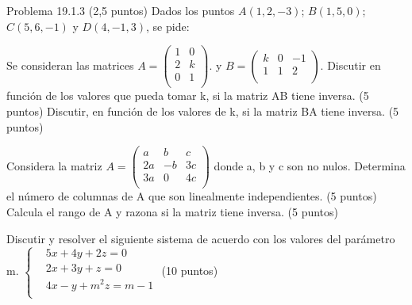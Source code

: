 \documentclass[addpoints,spanish, 12pt,a4paper]{exam}
\begin{document}
\begin{questions}


\question Problema 19.1.3 (2,5 puntos) Dados los puntos $A(1, 2, −3)$; $B(1, 5, 0)$; $C(5, 6, −1)$ y $D(4, −1, 3)$,
se pide:

\question Se consideran las matrices $A=\left( \begin{matrix}
   1 & 0  \\
   2 & k  \\
   0 & 1  \\
\end{matrix} \right)$. y $B=\left( \begin{matrix}
   k & 0 & -1  \\
   1 & 1 & 2  \\
\end{matrix} \right)$.
Discutir en función de los valores que pueda tomar k, si la matriz AB tiene inversa.	(5 puntos)
Discutir, en función de los valores de k, si la matriz BA tiene inversa.	(5 puntos)

\question Considera la matriz $A=\left( \begin{matrix}
   a & b & c  \\
   2a & -b & 3c  \\
   3a & 0 & 4c  \\
\end{matrix} \right)$ donde a, b y c son no nulos.
Determina el número de columnas de A que son linealmente independientes.	(5 puntos)
	Calcula el rango de A y razona si la matriz tiene inversa.	(5 puntos)


\question Discutir y resolver el siguiente sistema de acuerdo con los valores del parámetro m.
	$\left\{ \begin{matrix}
  & 5x+4y+2z=0 \\ 
 & 2x+3y+z=0 \\ 
 & 4x-y+{{m}^{2}}z=m-1 \\ 
\end{matrix} \right.$	(10 puntos)


\addpoints



\end{questions}
\end{document}
